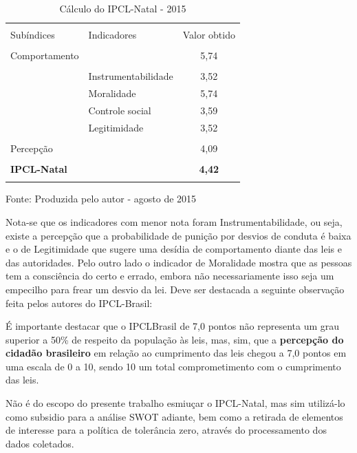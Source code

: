 \documentclass[
	12pt,				%
	openright,			%
	twoside,			%
	a4paper,			%
	chapter=TITLE,		%
	section=TITLE,		%
	subsection=TITLE,	%
	subsubsection=TITLE,%
	spanish,            %
	english,			%
	brazil				%
	]{abntex2}
\begin{document}
\begin{table}[!htpb]
	\begin{center}
		\caption{Cálculo do IPCL-Natal - 2015}%
		\label{Tabela 2}
		\begin{tabular}{llc}
			\hline\\
			Subíndices &  Indicadores & Valor obtido \\\\
			\hline
			\hline
			Comportamento & &5,74 \\
			\hline\\
			&Instrumentabilidade& 3,52\\
			&Moralidade& 5,74\\
			&Controle social& 3,59\\
			&Legitimidade& 3,52\\\\
			\hline
			Percepção& &4,09\\		 		 		 
			\hline\\
			\textbf{IPCL-Natal}& &\textbf{4,42}\\\\
			\hline
		\end{tabular}%
	\end{center}
	\ABNTEXchapterfont\small{Fonte: Produzida pelo autor - agosto de 2015}%
\end{table}
\FloatBarrier
\par
Nota-se que os indicadores com menor nota foram Instrumentabilidade, ou seja, existe a percepção que a probabilidade de punição por desvios de conduta é baixa e o de Legitimidade que sugere uma desídia de comportamento diante das leis e das autoridades. Pelo outro lado o indicador de Moralidade mostra que as pessoas tem a consciência do certo e errado, embora não necessariamente isso seja um empecilho para frear um desvio da lei. Deve ser destacada a seguinte observação feita pelos autores do IPCL-Brasil:
\begin{citacao}
	É importante destacar que o IPCLBrasil de 7,0 pontos não representa um
	grau superior a 50\% de respeito da população às leis, mas, sim, que a \textbf{percepção
		do cidadão brasileiro} em relação ao cumprimento das leis chegou a 7,0 pontos
	em uma escala de 0 a 10, sendo 10 um total comprometimento com o cumprimento das leis.\cite[p ~10, grifo do autor]{FGV}
\end{citacao}
\par
Não é do escopo do presente trabalho esmiuçar o IPCL-Natal, mas sim utilizá-lo como subsidio para a análise SWOT adiante, bem como a retirada
de elementos de interesse para a política de tolerância zero, através do processamento dos dados coletados.
\end{document}
